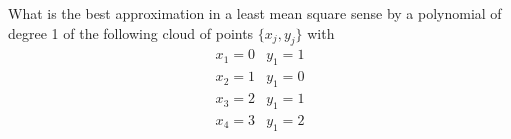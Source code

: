 \bexo


What is the best approximation in a least mean square sense by a polynomial of degree 1 of the following cloud of points  $\{x_j,y_j\}$
with 
\begin{eqnarray*}
x_1=0&y_1=1\\	
x_2=1&y_1=0\\	
x_3=2&y_1=1\\
x_4=3&y_1=2\\	
\end{eqnarray*}

\begin{center}
\end{center}
 

